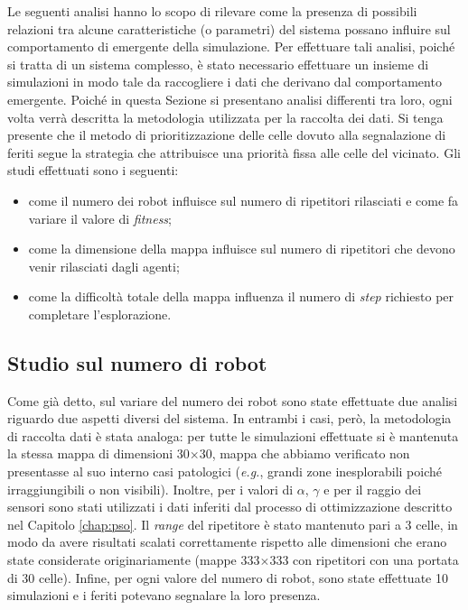 Le seguenti analisi hanno lo scopo di rilevare come la presenza di possibili relazioni tra alcune caratteristiche (o parametri) del sistema possano influire sul comportamento di emergente della simulazione.
Per effettuare tali analisi, poiché si tratta di un sistema complesso, è stato necessario effettuare un insieme di simulazioni in modo tale da raccogliere i dati che derivano dal comportamento emergente.
Poiché in questa Sezione si presentano analisi differenti tra loro, ogni volta verrà descritta la metodologia utilizzata per la raccolta dei dati.
Si tenga presente che il metodo di prioritizzazione delle celle dovuto alla segnalazione di feriti segue la strategia che attribuisce una priorità fissa alle celle del vicinato.
Gli studi effettuati sono i seguenti:\begin{itemize}
	\item come il numero dei robot influisce sul numero di ripetitori rilasciati e come fa variare il valore di \textit{fitness};
	\item come la dimensione della mappa influisce sul numero di ripetitori che devono venir rilasciati dagli agenti;
	\item come la difficoltà totale della mappa influenza il numero di \textit{step} richiesto per completare l'esplorazione.
\end{itemize}
\subsection{Studio sul numero di robot}
\label{subsec:nrobots}
Come già detto, sul variare del numero dei robot sono state effettuate due analisi riguardo due aspetti diversi del sistema.
In entrambi i casi, però, la metodologia di raccolta dati è stata analoga: per tutte le simulazioni effettuate si è mantenuta la stessa mappa di dimensioni 30$\times$30, mappa che abbiamo verificato non presentasse al suo interno casi patologici (\textit{e.g.}, grandi zone inesplorabili poiché irraggiungibili o non visibili).
Inoltre, per i valori di $\alpha$, $\gamma$ e per il raggio dei sensori sono stati utilizzati i dati inferiti dal processo di ottimizzazione descritto nel Capitolo \ref{chap:pso}. Il \textit{range} del ripetitore è stato mantenuto pari a 3 celle, in modo da avere risultati scalati correttamente rispetto alle dimensioni che erano state considerate originariamente (mappe 333$\times$333 con ripetitori con una portata di 30 celle). Infine, per ogni valore del numero di robot, sono state effettuate 10 simulazioni e i feriti potevano segnalare la loro presenza.


